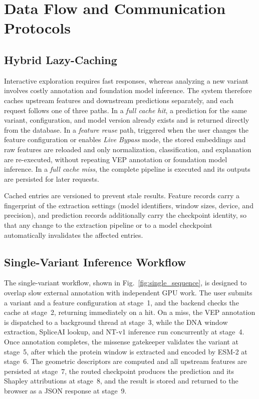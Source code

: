 \section{Data Flow and Communication Protocols}
\label{sec:data_flow}

\subsection{Hybrid Lazy-Caching}

Interactive exploration requires fast responses, whereas analyzing a new variant involves costly annotation and foundation model inference. The system therefore caches upstream features and downstream predictions separately, and each request follows one of three paths. In a \textit{full cache hit}, a prediction for the same variant, configuration, and model version already exists and is returned directly from the database. In a \textit{feature reuse} path, triggered when the user changes the feature configuration or enables \textit{Live Bypass} mode, the stored embeddings and raw features are reloaded and only normalization, classification, and explanation are re-executed, without repeating VEP annotation or foundation model inference. In a \textit{full cache miss}, the complete pipeline is executed and its outputs are persisted for later requests.

Cached entries are versioned to prevent stale results. Feature records carry a fingerprint of the extraction settings (model identifiers, window sizes, device, and precision), and prediction records additionally carry the checkpoint identity, so that any change to the extraction pipeline or to a model checkpoint automatically invalidates the affected entries.

\subsection{Single-Variant Inference Workflow}

The single-variant workflow, shown in Fig.~\ref{fig:single_sequence}, is designed to overlap slow external annotation with independent GPU work. The user submits a variant and a feature configuration at stage~1, and the backend checks the cache at stage~2, returning immediately on a hit. On a miss, the VEP annotation is dispatched to a background thread at stage~3, while the DNA window extraction, SpliceAI lookup, and NT-v1 inference run concurrently at stage~4. Once annotation completes, the missense gatekeeper validates the variant at stage~5, after which the protein window is extracted and encoded by ESM-2 at stage~6. The geometric descriptors are computed and all upstream features are persisted at stage~7, the routed checkpoint produces the prediction and its Shapley attributions at stage~8, and the result is stored and returned to the browser as a JSON response at stage~9.

